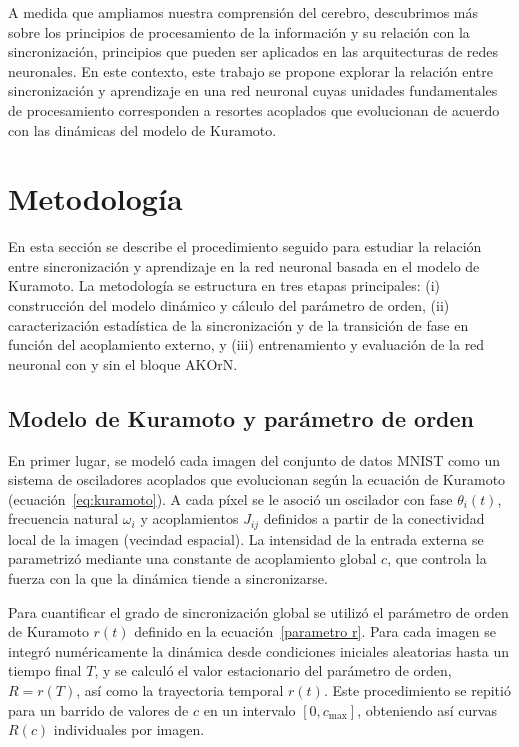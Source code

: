 \documentclass[12pt]{article}
\begin{document}
A medida que ampliamos nuestra comprensión del cerebro, descubrimos más sobre los principios de procesamiento de la información y su relación con la sincronización, principios que pueden ser aplicados en las arquitecturas de redes neuronales. En este contexto, este trabajo se propone explorar la relación entre sincronización y aprendizaje en una red neuronal cuyas unidades fundamentales de procesamiento corresponden a resortes acoplados que evolucionan de acuerdo con las dinámicas del modelo de Kuramoto.


\section{Metodología}

En esta sección se describe el procedimiento seguido para estudiar la relación entre sincronización y aprendizaje en la red neuronal basada en el modelo de Kuramoto. La metodología se estructura en tres etapas principales: (i) construcción del modelo dinámico y cálculo del parámetro de orden, (ii) caracterización estadística de la sincronización y de la transición de fase en función del acoplamiento externo, y (iii) entrenamiento y evaluación de la red neuronal con y sin el bloque AKOrN.

\subsection{Modelo de Kuramoto y parámetro de orden}

En primer lugar, se modeló cada imagen del conjunto de datos MNIST como un sistema de osciladores acoplados que evolucionan según la ecuación de Kuramoto (ecuación~\ref{eq:kuramoto}). A cada píxel se le asoció un oscilador con fase \(\theta_i(t)\), frecuencia natural \(\omega_i\) y acoplamientos \(J_{ij}\) definidos a partir de la conectividad local de la imagen (vecindad espacial). La intensidad de la entrada externa se parametrizó mediante una constante de acoplamiento global \(c\), que controla la fuerza con la que la dinámica tiende a sincronizarse.

Para cuantificar el grado de sincronización global se utilizó el parámetro de orden de Kuramoto \(r(t)\) definido en la ecuación~\ref{parametro r}. Para cada imagen se integró numéricamente la dinámica desde condiciones iniciales aleatorias hasta un tiempo final \(T\), y se calculó el valor estacionario del parámetro de orden, \(R = r(T)\), así como la trayectoria temporal \(r(t)\). Este procedimiento se repitió para un barrido de valores de \(c\) en un intervalo \([0, c_{\max}]\), obteniendo así curvas \(R(c)\) individuales por imagen.
\end{document}

